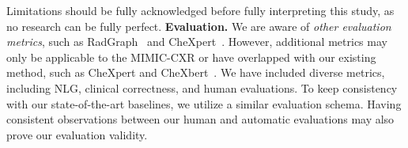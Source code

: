 \documentclass[sn-mathphys-num]{sn-jnl}%
\theoremstyle{thmstyleone}%
\theoremstyle{thmstyletwo}%
\theoremstyle{thmstylethree}%
\begin{document}
Limitations should be fully acknowledged before fully interpreting this study, as no research can be fully perfect.
\textbf{Evaluation.} We are aware of \textit{other evaluation metrics}, such as RadGraph~\cite{jain2021radgraph} and CheXpert~\cite{irvin2019chexpert}.
However, additional metrics may only be applicable to the MIMIC-CXR or have overlapped with our existing method, such as CheXpert and CheXbert~\cite{smit2020combining}.
We have included diverse metrics, including NLG, clinical correctness, and human evaluations.
To keep consistency with our state-of-the-art baselines, we utilize a similar evaluation schema.
Having consistent observations between our human and automatic evaluations may also prove our evaluation validity.


\backmatter



\end{document}
